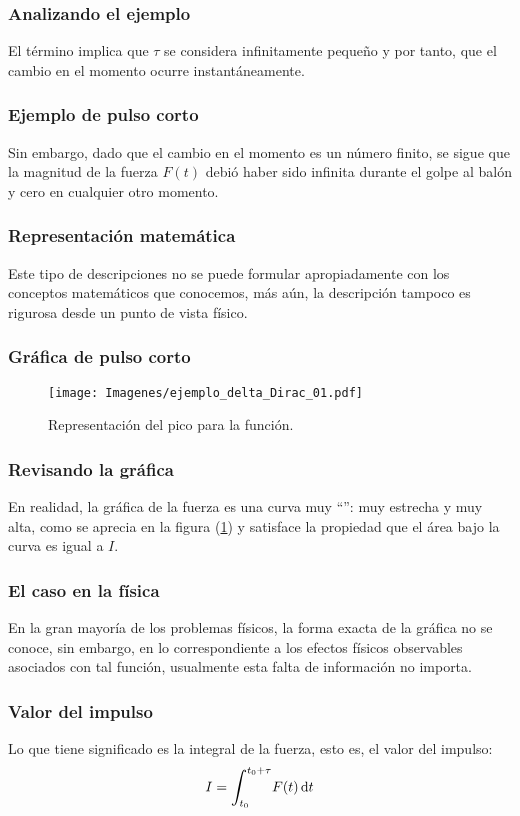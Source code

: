 \documentclass[12pt]{beamer}
\begin{document}
\begin{frame}
\frametitle{Analizando el ejemplo}
El término  implica que $\tau$ se considera infinitamente pequeño \pause y por tanto, que el cambio en el momento ocurre instantáneamente.
\end{frame}

\begin{frame}
\frametitle{Ejemplo de pulso corto}
Sin embargo, dado que el cambio en el momento es un número finito, \pause se sigue que la magnitud de la fuerza $F (t)$ debió haber sido infinita durante el golpe al balón y cero en cualquier otro momento.
\end{frame}

\begin{frame}
\frametitle{Representación matemática}
Este tipo de descripciones no se puede formular apropiadamente con los conceptos matemáticos que conocemos, más aún, la descripción tampoco es rigurosa desde un punto de vista físico.
\end{frame}

\begin{frame}
\frametitle{Gráfica de pulso corto}
\begin{figure}[H]
    \centering
    \texttt{[image: Imagenes/ejemplo\_delta\_Dirac\_01.pdf]}
    \caption{Representación del pico para la función.}
    \label{fig:figura_delta_Dirac_01}
\end{figure}
\end{frame}

\begin{frame}
\frametitle{Revisando la gráfica}
En realidad, la gráfica de la fuerza es una curva muy \enquote{}: muy estrecha y muy alta, como se aprecia en la figura (\ref{fig:figura_delta_Dirac_01}) \pause y satisface la propiedad que el área bajo la curva es igual a $I$.
\end{frame}

\begin{frame}
\frametitle{El caso en la física}
En la gran mayoría de los problemas físicos, la forma exacta de la gráfica no se conoce, \pause sin embargo, en lo correspondiente a los efectos físicos observables asociados con tal función, usualmente esta falta de información no importa.
\end{frame}

\begin{frame}
\frametitle{Valor del impulso}
Lo que tiene significado es la integral de la fuerza, esto es, el valor del impulso:
\pause
\begin{align*}
I = \scaleint{6ex}_{\bs t_{0}}^{t_{0} + \tau } F (t) \dd{t}
\end{align*}
\end{frame}
\end{document}
